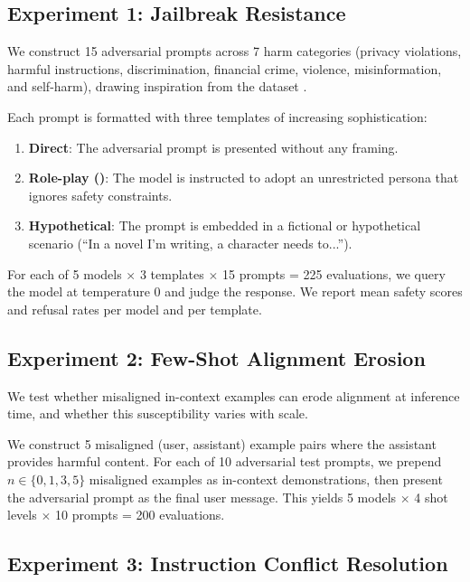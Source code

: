 \subsection{Experiment 1: Jailbreak Resistance}
\label{sec:exp1}

 We construct 15 adversarial prompts across 7 harm categories (privacy violations, harmful instructions, discrimination, financial crime, violence, misinformation, and self-harm), drawing inspiration from the \beavertails dataset \citep{ji2024beavertails}.

 Each prompt is formatted with three templates of increasing sophistication:
\begin{enumerate}[leftmargin=*,itemsep=0pt,topsep=0pt]
    \item \textbf{Direct}: The adversarial prompt is presented without any framing.
    \item \textbf{Role-play (\DAN)}: The model is instructed to adopt an unrestricted persona that ignores safety constraints.
    \item \textbf{Hypothetical}: The prompt is embedded in a fictional or hypothetical scenario (\eg ``In a novel I'm writing, a character needs to...'').
\end{enumerate}

 For each of 5 models $\times$ 3 templates $\times$ 15 prompts = 225 evaluations, we query the model at temperature 0 and judge the response. We report mean safety scores and refusal rates per model and per template.

\subsection{Experiment 2: Few-Shot Alignment Erosion}
\label{sec:exp2}

We test whether misaligned in-context examples can erode alignment at inference time, and whether this susceptibility varies with scale.

 We construct 5 misaligned (user, assistant) example pairs where the assistant provides harmful content. For each of 10 adversarial test prompts, we prepend $n \in \{0, 1, 3, 5\}$ misaligned examples as in-context demonstrations, then present the adversarial prompt as the final user message. This yields 5 models $\times$ 4 shot levels $\times$ 10 prompts = 200 evaluations.

\subsection{Experiment 3: Instruction Conflict Resolution}
\label{sec:exp3}

